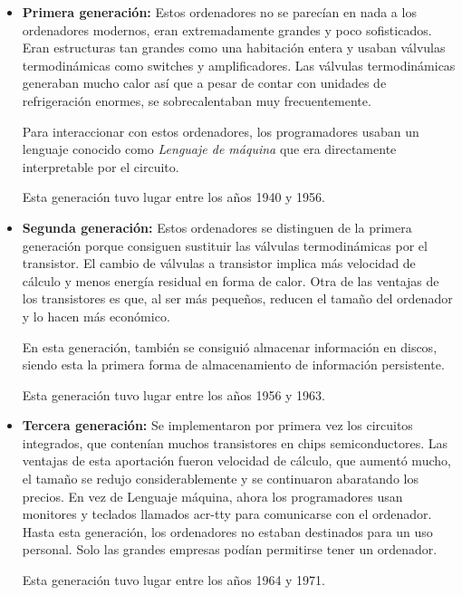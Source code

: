 \documentclass[twoside, titlepage, 12pt, a4paper]{article}
\begin{document}
\begin{itemize}
	\item{\textbf{Primera generación: }}Estos ordenadores no se parecían en nada a los ordenadores modernos, eran extremadamente grandes y poco sofisticados. Eran estructuras tan grandes como una habitación entera y usaban válvulas termodinámicas como switches y amplificadores. Las válvulas termodinámicas generaban mucho calor así que a pesar de contar con unidades de refrigeración enormes, se sobrecalentaban muy frecuentemente.\par Para interaccionar con estos ordenadores, los programadores usaban un lenguaje conocido como \textit{Lenguaje de máquina} que era directamente interpretable por el circuito.\par Esta generación tuvo lugar entre los años 1940 y 1956.
	\item{\textbf{Segunda generación: }}Estos ordenadores se distinguen de la primera generación porque consiguen sustituir las válvulas termodinámicas por el  transistor. El cambio de válvulas a transistor implica más velocidad de cálculo y menos energía residual en forma de calor. Otra de las ventajas de los transistores es que, al ser más pequeños, reducen el tamaño del ordenador y lo hacen más económico.\par En esta generación, también se consiguió almacenar información en discos, siendo esta la primera forma de almacenamiento de información persistente.\par Esta generación tuvo lugar entre los años 1956 y 1963.
	\item{\textbf{Tercera generación: }}Se implementaron por primera vez los circuitos integrados, que contenían muchos transistores en chips semiconductores. Las ventajas de esta aportación fueron velocidad de cálculo, que aumentó mucho, el tamaño se redujo considerablemente y se continuaron abaratando los precios. En vez de Lenguaje máquina, ahora los programadores usan monitores y teclados llamados \gls{acr-tty} para comunicarse con el ordenador. Hasta esta generación, los ordenadores no estaban destinados para un uso personal. Solo las grandes empresas podían permitirse tener un ordenador.\par Esta generación tuvo lugar entre los años 1964 y 1971.

\end{itemize}
\end{document}
